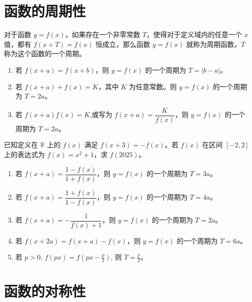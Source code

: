 \section{函数的周期性}

\begin{theorem}[周期函数定义]
    对于函数 $y=f(x)$，如果存在一个非零常数 $T$，使得对于定义域内的任意一个 $x$ 值，都有 $f(x+T) = f(x)$ 恒成立，那么函数 $y=f(x)$ 就称为周期函数，$T$ 称为这个函数的一个周期。
\end{theorem}

\begin{theorem}[周期性基本结论]
    \begin{enumerate}
        \item 若 $f(x+a) = f(x+b)$，则 $y=f(x)$ 的一个周期为 $T = |b-a|$。
        \item 若 $f(x+a) + f(x) = K$，其中 $K$ 为任意常数。则 $y=f(x)$ 的一个周期为 $T = 2a$。
        \item 若 $f(x+a)f(x) = K$,或写为 $f(x+a) = \dfrac{K}{f(x)}$，则 $y=f(x)$ 的一个周期为 $T = 2a$。
    \end{enumerate}
\end{theorem}

\begin{example}
    已知定义在 $\mathbb{R}$ 上的 $f(x)$ 满足 $f(x+3) = -f(x)$。若 $f(x)$ 在区间 $[-2, 2]$ 上的表达式为 $f(x) = x^2+1$，求 $f(2025)$。
\end{example}

\begin{theorem}[不太常用的结论]
    \begin{enumerate}
        \item 若 $f(x+a) = \dfrac{1-f(x)}{1+f(x)}$，则 $y=f(x)$ 的一个周期为 $T=3a$。
        \item 若 $f(x+a) = \dfrac{1+f(x)}{1-f(x)}$，则 $y=f(x)$ 的一个周期为 $T=4a$。
        \item 若 $f(x+a) = -\dfrac{1}{f(x)+1}$，则 $y=f(x)$ 的一个周期为 $T=2a$。
        \item 若 $f(x+2a) = f(x+a) - f(x)$，则 $y=f(x)$ 的一个周期为 $T=6a$。
        \item 若 $p>0$, $f(px)=f(px-\frac{p}{2})$, 则 $T=\frac{p}{2}$。
    \end{enumerate}
\end{theorem}

\section{函数的对称性}

